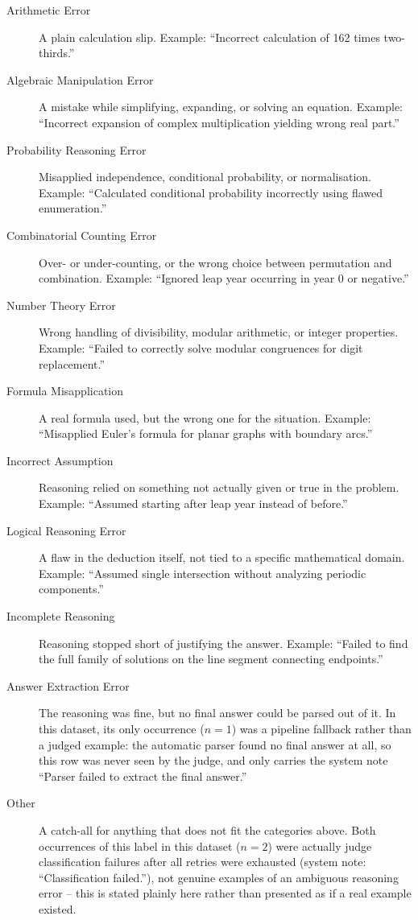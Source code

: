 \begin{description}
  \item[Arithmetic Error] A plain calculation slip. Example: ``Incorrect
  calculation of 162 times two-thirds.''
  \item[Algebraic Manipulation Error] A mistake while simplifying,
  expanding, or solving an equation. Example: ``Incorrect expansion of
  complex multiplication yielding wrong real part.''
  \item[Probability Reasoning Error] Misapplied independence, conditional
  probability, or normalisation. Example: ``Calculated conditional
  probability incorrectly using flawed enumeration.''
  \item[Combinatorial Counting Error] Over- or under-counting, or the
  wrong choice between permutation and combination. Example: ``Ignored
  leap year occurring in year 0 or negative.''
  \item[Number Theory Error] Wrong handling of divisibility, modular
  arithmetic, or integer properties. Example: ``Failed to correctly
  solve modular congruences for digit replacement.''
  \item[Formula Misapplication] A real formula used, but the wrong one
  for the situation. Example: ``Misapplied Euler's formula for planar
  graphs with boundary arcs.''
  \item[Incorrect Assumption] Reasoning relied on something not actually
  given or true in the problem. Example: ``Assumed starting after leap
  year instead of before.''
  \item[Logical Reasoning Error] A flaw in the deduction itself, not tied
  to a specific mathematical domain. Example: ``Assumed single
  intersection without analyzing periodic components.''
  \item[Incomplete Reasoning] Reasoning stopped short of justifying the
  answer. Example: ``Failed to find the full family of solutions on the
  line segment connecting endpoints.''
  \item[Answer Extraction Error] The reasoning was fine, but no final
  answer could be parsed out of it. In this dataset, its only occurrence
  ($n=1$) was a pipeline fallback rather than a judged example: the
  automatic parser found no final answer at all, so this row was never
  seen by the judge, and only carries the system note ``Parser failed to
  extract the final answer.''
  \item[Other] A catch-all for anything that does not fit the categories
  above. Both occurrences of this label in this dataset ($n=2$) were
  actually judge classification failures after all retries were
  exhausted (system note: ``Classification failed.''), not genuine
  examples of an ambiguous reasoning error -- this is stated plainly
  here rather than presented as if a real example existed.
\end{description}

